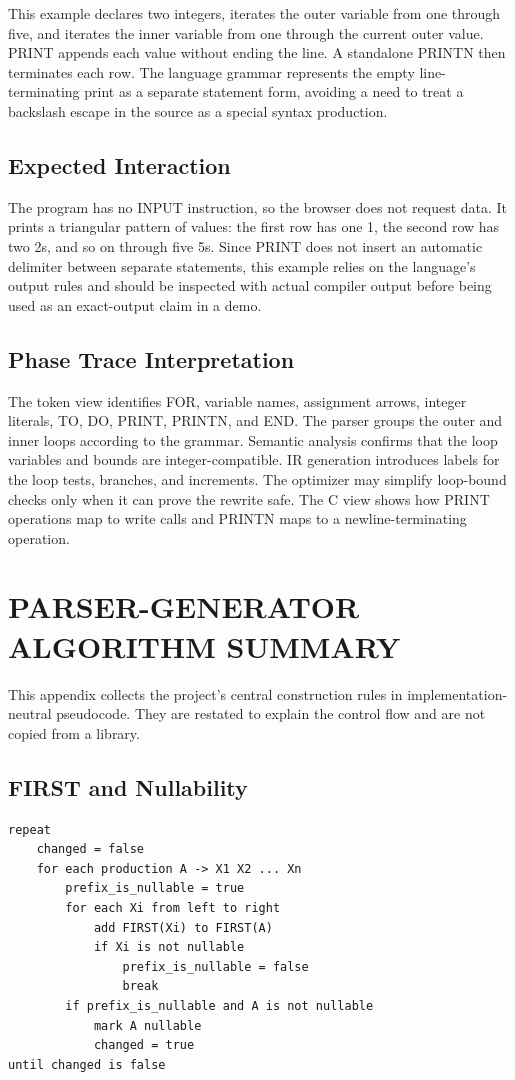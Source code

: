 \documentclass[12pt,a4paper,oneside]{report}
\begin{document}
This example declares two integers, iterates the outer variable from one through five, and iterates the inner variable from one through the current outer value. PRINT appends each value without ending the line. A standalone PRINTN then terminates each row. The language grammar represents the empty line-terminating print as a separate statement form, avoiding a need to treat a backslash escape in the source as a special syntax production.

\section{Expected Interaction}
The program has no INPUT instruction, so the browser does not request data. It prints a triangular pattern of values: the first row has one 1, the second row has two 2s, and so on through five 5s. Since PRINT does not insert an automatic delimiter between separate statements, this example relies on the language's output rules and should be inspected with actual compiler output before being used as an exact-output claim in a demo.

\section{Phase Trace Interpretation}
The token view identifies FOR, variable names, assignment arrows, integer literals, TO, DO, PRINT, PRINTN, and END. The parser groups the outer and inner loops according to the grammar. Semantic analysis confirms that the loop variables and bounds are integer-compatible. IR generation introduces labels for the loop tests, branches, and increments. The optimizer may simplify loop-bound checks only when it can prove the rewrite safe. The C view shows how PRINT operations map to write calls and PRINTN maps to a newline-terminating operation.

\chapter{PARSER-GENERATOR ALGORITHM SUMMARY}
This appendix collects the project's central construction rules in implementation-neutral pseudocode. They are restated to explain the control flow and are not copied from a library.

\section{FIRST and Nullability}
\begin{lstlisting}[caption={Fixed-Point FIRST and Nullable Computation}]
repeat
    changed = false
    for each production A -> X1 X2 ... Xn
        prefix_is_nullable = true
        for each Xi from left to right
            add FIRST(Xi) to FIRST(A)
            if Xi is not nullable
                prefix_is_nullable = false
                break
        if prefix_is_nullable and A is not nullable
            mark A nullable
            changed = true
until changed is false
\end{lstlisting}
\end{document}
